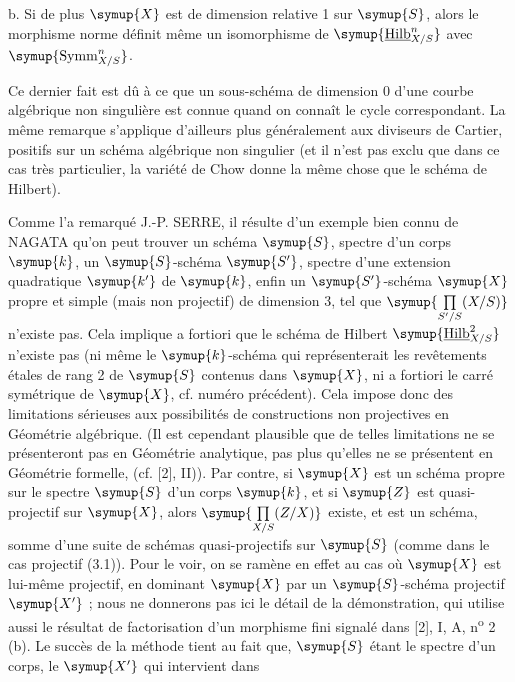 \medskip
\noindent b. Si de plus $\symup{X}$ est de dimension relative 1 sur $\symup{S}$, alors le
morphisme norme définit même un isomorphisme de
$\symup{\underline{\operatorname{Hilb}}^n_{X/S}}$ avec $\symup{\operatorname{Symm}^n_{X/S}}$.

Ce dernier fait est dû à ce que un sous-schéma de dimension 0 d'une courbe
algébrique non singulière est connue quand on connaît le cycle correspondant. La
même remarque s'applique d'ailleurs plus généralement aux diviseurs de Cartier,
positifs sur un schéma algébrique non singulier (et il n'est pas exclu que dans
ce cas très particulier, la variété de Chow donne la même chose que le schéma
de Hilbert).


Comme l'a remarqué J.-P. SERRE, il résulte d'un exemple bien connu de NAGATA
qu'on peut trouver un schéma $\symup{S}$, spectre d'un corps $\symup{k}$, un $\symup{S}$-schéma $\symup{S'}$,
spectre d'une extension quadratique $\symup{k'}$ de $\symup{k}$, enfin un $\symup{S'}$-schéma $\symup{X}$
propre et simple (mais non projectif) de dimension 3, tel que
$\symup{\prod\limits_{S'/S}(X/S)}$ n'existe pas. Cela implique a fortiori que le schéma de
Hilbert $\symup{\underline{\operatorname{Hilb}}^2_{X/S}}$ n'existe pas (ni même le $\symup{k}$-schéma qui
représenterait les revêtements étales de rang 2 de $\symup{S}$ contenus dans $\symup{X}$, ni a
fortiori le carré symétrique de $\symup{X}$, cf. numéro précédent). Cela impose donc
des limitations sérieuses aux possibilités de constructions non projectives en
Géométrie algébrique. (Il est cependant plausible que de telles limitations ne
se présenteront pas en Géométrie analytique, pas plus qu'elles ne se présentent
en Géométrie formelle, (cf. [2], II)). Par contre, si $\symup{X}$ est un schéma propre
sur le spectre $\symup{S}$ d'un corps $\symup{k}$, et si $\symup{Z}$ est quasi-projectif sur $\symup{X}$, alors
$\symup{\prod\limits_{X/S}(Z/X)}$ existe, et est un schéma, somme d'une suite de schémas
quasi-projectifs sur $\symup{S}$ (comme dans le cas projectif (3.1)). Pour le voir, on
se ramène en effet au cas où $\symup{X}$ est lui-même projectif, en dominant $\symup{X}$ par un
$\symup{S}$-schéma projectif $\symup{X'}$ ; nous ne donnerons pas ici le détail de la
démonstration, qui utilise aussi le résultat de factorisation d'un morphisme
fini signalé dans [2], I, A, n\textsuperscript{o} 2 (b). Le succès de la méthode
tient au fait que, $\symup{S}$ étant le spectre d'un corps, le $\symup{X'}$ qui intervient dans
